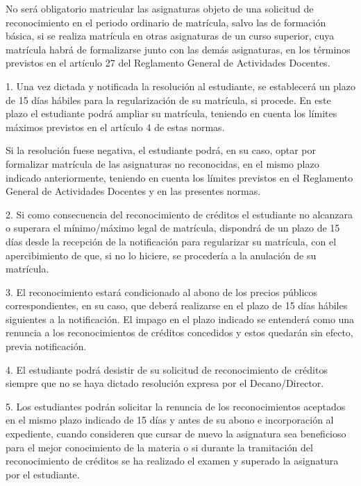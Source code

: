 \documentclass{article}
\begin{document}
\begin{itemize}
\begin{itemize}
\begin{scriptsize}
                  No será obligatorio matricular las asignaturas objeto de una solicitud de reconocimiento en el periodo ordinario de matrícula, salvo las de formación básica, si se realiza matrícula en otras asignaturas de un curso superior, cuya matrícula habrá de formalizarse junto con las demás asignaturas, en los términos previstos en el artículo 27 del Reglamento General de Actividades Docentes.

                  1. Una vez dictada y notificada la resolución al estudiante, se establecerá un plazo de 15 días hábiles para la regularización de su matrícula, si procede. En este plazo el estudiante podrá ampliar su matrícula, teniendo en cuenta los límites máximos previstos en el artículo 4 de estas normas.

                  Si la resolución fuese negativa, el estudiante podrá, en su caso, optar por formalizar matrícula de las asignaturas no reconocidas, en el mismo plazo indicado anteriormente, teniendo en cuenta los límites previstos en el Reglamento General de Actividades Docentes y en las presentes normas.

                  2. Si como consecuencia del reconocimiento de créditos el estudiante no alcanzara o superara el mínimo/máximo legal de matrícula, dispondrá de un plazo de 15 días desde la recepción de la notificación para regularizar su matrícula, con el apercibimiento de que, si no lo hiciere, se procedería a la anulación de su matrícula.

                  3. El reconocimiento estará condicionado al abono de los precios públicos correspondientes, en su caso, que deberá realizarse en el plazo de 15 días hábiles siguientes a la notificación. El impago en el plazo indicado se entenderá como una renuncia a los reconocimientos de créditos concedidos y estos quedarán sin efecto, previa notificación.

                  4. El estudiante podrá desistir de su solicitud de reconocimiento de créditos siempre que no se haya dictado resolución expresa por el Decano/Director.

                  5. Los estudiantes podrán solicitar la renuncia de los reconocimientos aceptados en el mismo plazo indicado de 15 días y antes de su abono e incorporación al expediente, cuando consideren que cursar de nuevo la asignatura sea beneficioso para el mejor conocimiento de la materia o si durante la tramitación del reconocimiento de créditos se ha realizado el examen y superado la asignatura por el estudiante.


\end{scriptsize}
\end{itemize}
\end{itemize}
\end{document}
